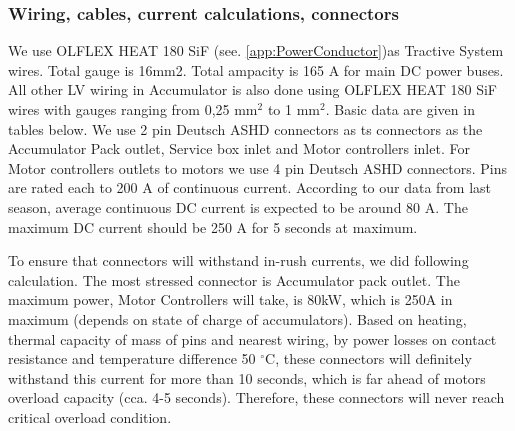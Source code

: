 \subsubsection{Wiring, cables, current calculations, connectors}\label{subsec:acp_wiring}


We use OLFLEX HEAT 180 SiF (see. \ref{app:PowerConductor})as Tractive System wires. Total gauge is 16mm2. Total ampacity is 165 A for main DC power buses. All other LV wiring in Accumulator is also done using OLFLEX HEAT 180 SiF wires with gauges ranging from 0,25 mm$^2$ to 1 mm$^2$. Basic data are given in tables below. We use 2 pin Deutsch ASHD connectors as \gls{ts} connectors as the Accumulator Pack outlet, Service box inlet and Motor controllers inlet. For Motor controllers outlets to motors we use 4 pin Deutsch ASHD connectors. Pins are rated each to 200 A of continuous current. According to our data from last season, average continuous DC current is expected to be around 80 A. The maximum DC current should be 250 A for 5 seconds at maximum.

To ensure that connectors will withstand in-rush currents, we did following calculation. The most stressed connector is Accumulator pack outlet. The maximum power, Motor Controllers will take, is 80kW, which is 250A in maximum (depends on state of charge of accumulators). Based on heating, thermal capacity of mass of pins and nearest wiring, by power losses on contact resistance and temperature difference 50 $^\circ$C, these connectors will definitely withstand this current for more than 10 seconds, which is far ahead of motors overload capacity (cca. 4-5 seconds). Therefore, these connectors will never reach critical overload condition.


